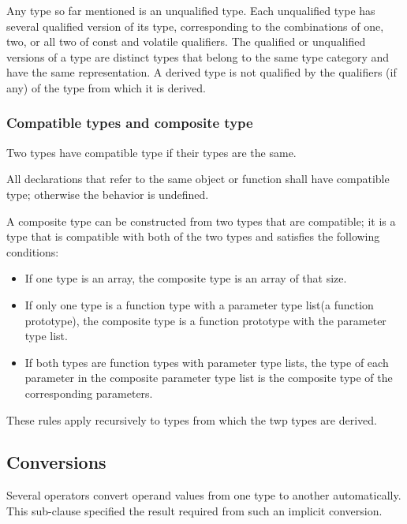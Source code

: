 \documentclass{article}
\begin{document}
Any type so far mentioned is an unqualified type.  Each unqualified type has several 
qualified version of its type, corresponding to the combinations of one, two, or all 
two of const and volatile qualifiers.  The qualified or unqualified versions of a type 
are distinct types that belong to the same type category and have the same representation.
A derived type is not qualified by the qualifiers (if any) of the type from which it 
is derived.
\linebreak

\subsubsection{Compatible types and composite type}
Two types have compatible type if their types are the same.
\linebreak

All declarations that refer to the same object or function shall have compatible type; 
otherwise the behavior is undefined.
\linebreak

A composite type can be constructed from two types that are compatible; it is a type that 
is compatible with both of the two types and satisfies the following conditions:
\begin{itemize}
	\item If one type is an array, the composite type is an array of that size.
	\item If only one type is a function type with a parameter type list(a function 
	      prototype), the composite type is a function prototype with the parameter type 
	      list.
	\item If both types are function types with parameter type lists, the type of each 
	      parameter in the composite parameter type list is the composite type of the 
	      corresponding parameters.
\end{itemize}
These rules apply recursively to types from which the twp types are derived.
\linebreak

\subsection{Conversions}
Several operators convert operand values from one type to another automatically. This 
sub-clause specified the result required from such an implicit conversion.
\linebreak
\end{document}
